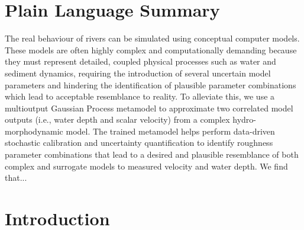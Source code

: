 \documentclass[draft,linenumbers,onecolumn]{agujournal2019} %
\begin{document}
\section*{Plain Language Summary}

The real behaviour of rivers can be simulated using conceptual computer models. These models are often highly complex and computationally demanding because they must represent detailed, coupled physical processes such as water and sediment dynamics, requiring the introduction of several uncertain model parameters and hindering the identification of plausible parameter combinations which lead to acceptable resemblance to reality. To alleviate this, we use a multioutput Gaussian Process metamodel to approximate two correlated model outputs (i.e., water depth and scalar velocity) from a complex  hydro-morphodynamic model. The trained metamodel helps perform data-driven stochastic calibration and uncertainty quantification to identify roughness parameter combinations that lead to a desired and plausible resemblance of both complex and  surrogate models to measured velocity and water depth. We find that...   


\section{Introduction}
\end{document}
